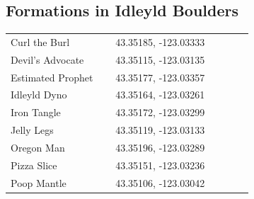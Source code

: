 \begin{flushleft}
\subsection{Formations in Idleyld Boulders}
\begin{center}
\begin{supertabular}{p{0.38\linewidth}p{0.5\linewidth}}
Curl the Burl & 43.35185, -123.03333 \\
Devil's Advocate & 43.35115, -123.03135 \\
Estimated Prophet & 43.35177, -123.03357 \\
Idleyld Dyno & 43.35164, -123.03261 \\
Iron Tangle & 43.35172, -123.03299 \\
Jelly Legs & 43.35119, -123.03133 \\
Oregon Man & 43.35196, -123.03289 \\
Pizza Slice & 43.35151, -123.03236 \\
Poop Mantle & 43.35106, -123.03042 \\

\end{supertabular}
\end{center}
\end{flushleft}
